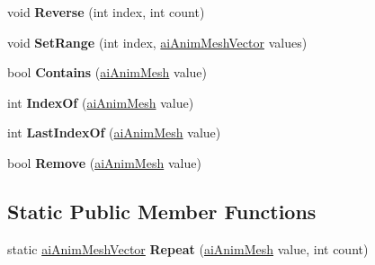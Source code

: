 \begin{DoxyCompactItemize}
\item 
\hypertarget{classai_anim_mesh_vector_a92bc4a846930dbca0df5a741d6138d48}{void {\bfseries Reverse} (int index, int count)}\label{classai_anim_mesh_vector_a92bc4a846930dbca0df5a741d6138d48}

\item 
\hypertarget{classai_anim_mesh_vector_a0fda37ee507ffe44d1d92e6d2b34ec7a}{void {\bfseries Set\+Range} (int index, \hyperlink{classai_anim_mesh_vector}{ai\+Anim\+Mesh\+Vector} values)}\label{classai_anim_mesh_vector_a0fda37ee507ffe44d1d92e6d2b34ec7a}

\item 
\hypertarget{classai_anim_mesh_vector_a8d71902a79102e73afcf3fc31707aa45}{bool {\bfseries Contains} (\hyperlink{structai_anim_mesh}{ai\+Anim\+Mesh} value)}\label{classai_anim_mesh_vector_a8d71902a79102e73afcf3fc31707aa45}

\item 
\hypertarget{classai_anim_mesh_vector_a297fd8dbcc7100734f5bf2c8505c632d}{int {\bfseries Index\+Of} (\hyperlink{structai_anim_mesh}{ai\+Anim\+Mesh} value)}\label{classai_anim_mesh_vector_a297fd8dbcc7100734f5bf2c8505c632d}

\item 
\hypertarget{classai_anim_mesh_vector_ac867528c37fe440ed66151212a4a2dc8}{int {\bfseries Last\+Index\+Of} (\hyperlink{structai_anim_mesh}{ai\+Anim\+Mesh} value)}\label{classai_anim_mesh_vector_ac867528c37fe440ed66151212a4a2dc8}

\item 
\hypertarget{classai_anim_mesh_vector_a515a247a9636c87838175ec2e42a3c04}{bool {\bfseries Remove} (\hyperlink{structai_anim_mesh}{ai\+Anim\+Mesh} value)}\label{classai_anim_mesh_vector_a515a247a9636c87838175ec2e42a3c04}

\end{DoxyCompactItemize}
\subsection*{Static Public Member Functions}
\begin{DoxyCompactItemize}
\item 
\hypertarget{classai_anim_mesh_vector_a3133c2317a32404d0e5b326fbeac1e1a}{static \hyperlink{classai_anim_mesh_vector}{ai\+Anim\+Mesh\+Vector} {\bfseries Repeat} (\hyperlink{structai_anim_mesh}{ai\+Anim\+Mesh} value, int count)}\label{classai_anim_mesh_vector_a3133c2317a32404d0e5b326fbeac1e1a}

\end{DoxyCompactItemize}
